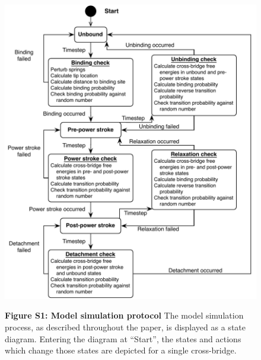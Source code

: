 \documentclass[10pt]{article}
\date{} %
\begin{document}
\begin{figure}[!ht]
    \begin{center}
    \includegraphics[width=16cm]{./fig_simulation_process.pdf}
    \parbox{\textwidth}{
        \vspace{1em}
        \textbf{Figure S1: Model simulation protocol}
        The model simulation process, as described throughout the paper, is displayed as a state diagram. 
        Entering the diagram at ``Start'', the states and actions which change those states are depicted for a single cross-bridge. 
        \label{fig_simulation_process}
        }
    \end{center}
\end{figure}
\end{document}

